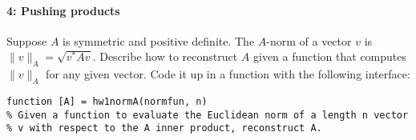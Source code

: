 \documentclass[12pt, leqno]{article}
\begin{document}
\paragraph*{4: Pushing products}
Suppose $A$ is symmetric and positive definite.  The $A$-norm of a
vector $v$ is $\|v\|_A = \sqrt{v^* A v}$.  Describe how to reconstruct
$A$ given a function that computes $\|v\|_A$ for any given vector.
Code it up in a function with the following interface:
\begin{lstlisting}
function [A] = hw1normA(normfun, n)
% Given a function to evaluate the Euclidean norm of a length n vector
% v with respect to the A inner product, reconstruct A.
\end{lstlisting}
\end{document}
